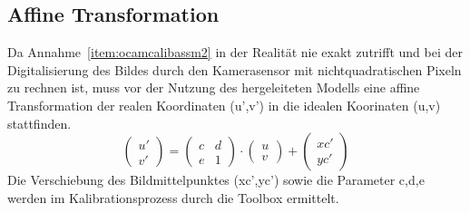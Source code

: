 \subsection{Affine Transformation}
Da Annahme~\ref{item:ocamcalibassm2} in der Realität nie exakt zutrifft  und bei der Digitalisierung des Bildes durch den Kamerasensor mit nichtquadratischen Pixeln zu rechnen ist, muss vor der Nutzung des hergeleiteten Modells eine affine Transformation der realen Koordinaten (u',v') in die idealen Koorinaten (u,v) stattfinden.
\begin{equation}
\begin{pmatrix}
u' \\ v' 
\end{pmatrix}
=
\begin{pmatrix}
 c & d \\
 e & 1 
\end{pmatrix}
\cdot
\begin{pmatrix}
u \\ v 
\end{pmatrix}
+
\begin{pmatrix}
xc' \\ yc' 
\end{pmatrix}
\end{equation}
 Die Verschiebung des Bildmittelpunktes (xc',yc') sowie die Parameter c,d,e werden im Kalibrationsprozess durch die Toolbox ermittelt.


